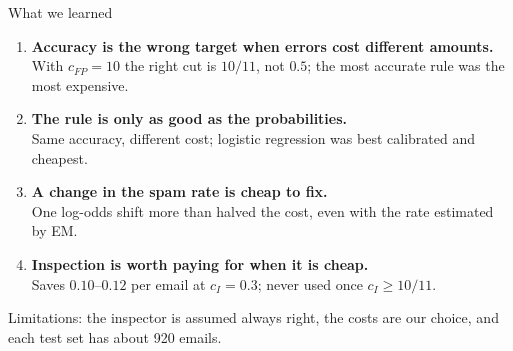 \documentclass[aspectratio=169,11pt]{beamer}
\newcommand{\thepresenter}{}
\newcommand{\presenter}[1]{\renewcommand{\thepresenter}{#1}}
\newcommand{\cfp}{c_{FP}}
\newcommand{\ci}{c_I}
\newcommand{\key}[1]{\textcolor{accent}{\textbf{#1}}}
\begin{document}
\presenter{Saatwik Tiwari}
\begin{frame}{What we learned}
\begin{enumerate}
  \item \key{Accuracy is the wrong target when errors cost different amounts.}\\
        With $\cfp=10$ the right cut is $10/11$, not $0.5$; the most accurate rule was the most expensive.
  \item \key{The rule is only as good as the probabilities.}\\
        Same accuracy, different cost; logistic regression was best calibrated and cheapest.
  \item \key{A change in the spam rate is cheap to fix.}\\
        One log-odds shift more than halved the cost, even with the rate estimated by EM.
  \item \key{Inspection is worth paying for when it is cheap.}\\
        Saves $0.10$--$0.12$ per email at $\ci=0.3$; never used once $\ci\ge10/11$.
\end{enumerate}
\vspace{0.4em}
{\small\textcolor{muted}{Limitations: the inspector is assumed always right, the costs are our choice, and each test set has about 920 emails.}}
\end{frame}
\end{document}
